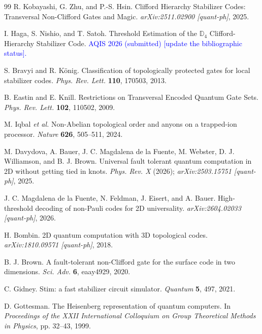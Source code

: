 \documentclass[a4paper]{article}
\newcommand{\blue}[1]{\textcolor{blue}{#1}}
\begin{document}
\begin{thebibliography}{99}
R. Kobayashi, G. Zhu, and P.-S. Hsin.
\newblock Clifford Hierarchy Stabilizer Codes: Transversal Non-Clifford Gates and Magic.
\newblock \textit{arXiv:2511.02900 [quant-ph]}, 2025.

I. Haga, S. Nishio, and T. Satoh.
\newblock Threshold Estimation of the $\mathbb{D}_4$ Clifford-Hierarchy Stabilizer Code.
\newblock \blue{AQIS 2026 (submitted) [update the bibliographic status].}

S. Bravyi and R. K\"onig.
\newblock Classification of topologically protected gates for local stabilizer codes.
\newblock \textit{Phys. Rev. Lett.} \textbf{110}, 170503, 2013.

B. Eastin and E. Knill.
\newblock Restrictions on Transversal Encoded Quantum Gate Sets.
\newblock \textit{Phys. Rev. Lett.} \textbf{102}, 110502, 2009.

M. Iqbal \textit{et al.}
\newblock Non-Abelian topological order and anyons on a trapped-ion processor.
\newblock \textit{Nature} \textbf{626}, 505--511, 2024.

M. Davydova, A. Bauer, J. C. Magdalena de la Fuente, M. Webster, D. J. Williamson, and B. J. Brown.
\newblock Universal fault tolerant quantum computation in 2D without getting tied in knots.
\newblock \textit{Phys. Rev. X} (2026); \textit{arXiv:2503.15751 [quant-ph]}, 2025.

J. C. Magdalena de la Fuente, N. Feldman, J. Eisert, and A. Bauer.
\newblock High-threshold decoding of non-Pauli codes for 2D universality.
\newblock \textit{arXiv:2604.02033 [quant-ph]}, 2026.

H. Bombin.
\newblock 2D quantum computation with 3D topological codes.
\newblock \textit{arXiv:1810.09571 [quant-ph]}, 2018.

B. J. Brown.
\newblock A fault-tolerant non-Clifford gate for the surface code in two dimensions.
\newblock \textit{Sci. Adv.} \textbf{6}, eaay4929, 2020.

C. Gidney.
\newblock Stim: a fast stabilizer circuit simulator.
\newblock \textit{Quantum} \textbf{5}, 497, 2021.

D. Gottesman.
\newblock The Heisenberg representation of quantum computers.
\newblock In \textit{Proceedings of the XXII International Colloquium on Group Theoretical Methods in Physics}, pp. 32--43, 1999.


\end{thebibliography}
\end{document}
